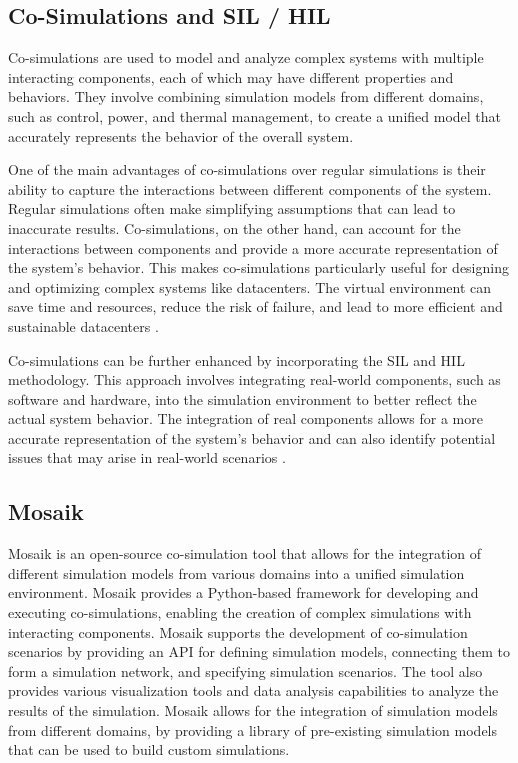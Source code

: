 \subsection{Co-Simulations and SIL / HIL}

Co-simulations are used to model and analyze complex systems with multiple
interacting components, each of which may have different properties and
behaviors. They involve combining simulation models from different domains, such
as control, power, and thermal management, to create a unified model that
accurately represents the behavior of the overall system.

One of the main advantages of co-simulations over regular simulations is their
ability to capture the interactions between different components of the system.
Regular simulations often make simplifying assumptions that can lead to
inaccurate results. Co-simulations, on the other hand, can account for the
interactions between components and provide a more accurate representation of
the system's behavior. This makes co-simulations particularly useful for
designing and optimizing complex systems like datacenters. The virtual
environment can save time and resources, reduce the risk of failure, and lead to
more efficient and sustainable datacenters \cite{vogt2018}.

Co-simulations can be further enhanced by incorporating the SIL and HIL
methodology. This approach involves integrating real-world components, such as
software and hardware, into the simulation environment to better reflect the
actual system behavior. The integration of real components allows for a more
accurate representation of the system's behavior and can also identify potential
issues that may arise in real-world scenarios \cite{kelemenova2013}.

\subsection{Mosaik}

Mosaik is an open-source co-simulation tool that allows for the integration of
different simulation models from various domains into a unified simulation
environment. Mosaik provides a Python-based framework for developing and
executing co-simulations, enabling the creation of complex simulations with
interacting components. Mosaik supports the development of co-simulation
scenarios by providing an API for defining simulation models, connecting them to
form a simulation network, and specifying simulation scenarios. The tool also
provides various visualization tools and data analysis capabilities to analyze
the results of the simulation. Mosaik allows for the integration of simulation
models from different domains, by providing a library of pre-existing simulation
models that can be used to build custom simulations.

